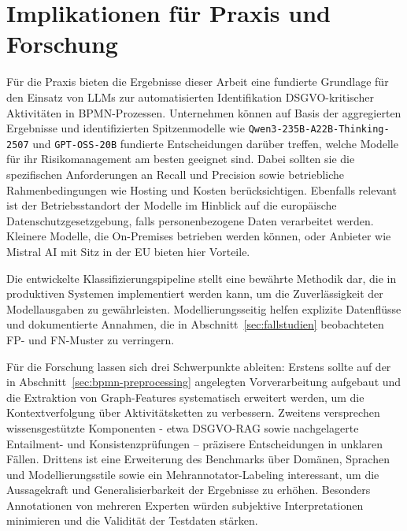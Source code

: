\section{Implikationen für Praxis und Forschung}\label{sec:implikationen-fur-praxis-und-forschung}

Für die Praxis bieten die Ergebnisse dieser Arbeit eine fundierte Grundlage für den Einsatz von \acp{LLM} zur automatisierten Identifikation \ac{DSGVO}-kritischer Aktivitäten in \ac{BPMN}-Prozessen. Unternehmen können auf Basis der aggregierten Ergebnisse und identifizierten Spitzenmodelle wie \texttt{Qwen3-235B-A22B-Thinking-2507} und \texttt{GPT-OSS-20B} fundierte Entscheidungen darüber treffen, welche Modelle für ihr Risikomanagement am besten geeignet sind. Dabei sollten sie die spezifischen Anforderungen an Recall und Precision sowie betriebliche Rahmenbedingungen wie Hosting und Kosten berücksichtigen. Ebenfalls relevant ist der Betriebsstandort der Modelle im Hinblick auf die europäische Datenschutzgesetzgebung, falls personenbezogene Daten verarbeitet werden. Kleinere Modelle, die On-Premises betrieben werden können, oder Anbieter wie Mistral AI mit Sitz in der \ac{EU} bieten hier Vorteile.

Die entwickelte Klassifizierungspipeline stellt eine bewährte Methodik dar, die in produktiven Systemen implementiert werden kann, um die Zuverlässigkeit der Modellausgaben zu gewährleisten. Modellierungsseitig helfen explizite Datenflüsse und dokumentierte Annahmen, die in Abschnitt~\ref{sec:fallstudien} beobachteten \ac{FP}- und \ac{FN}-Muster zu verringern.

Für die Forschung lassen sich drei Schwerpunkte ableiten: Erstens sollte auf der in Abschnitt~\ref{sec:bpmn-preprocessing} angelegten Vorverarbeitung aufgebaut und die Extraktion von Graph-Features systematisch erweitert werden, um die Kontextverfolgung über Aktivitätsketten zu verbessern. Zweitens versprechen wissensgestützte Komponenten - etwa \ac{DSGVO}-\ac{RAG} sowie nachgelagerte Entailment- und Konsistenzprüfungen – präzisere Entscheidungen in unklaren Fällen. Drittens ist eine Erweiterung des Benchmarks über Domänen, Sprachen und Modellierungsstile sowie ein Mehrannotator-Labeling interessant, um die Aussagekraft und Generalisierbarkeit der Ergebnisse zu erhöhen. Besonders Annotationen von mehreren Experten würden subjektive Interpretationen minimieren und die Validität der Testdaten stärken.